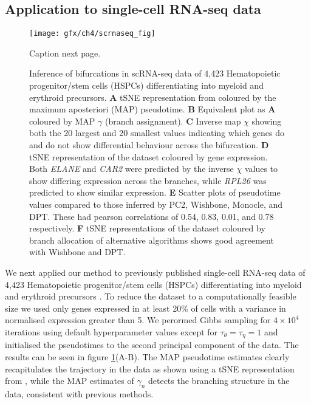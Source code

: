 \subsection{Application to single-cell RNA-seq data}

\begin{figure}
	\centering
	\texttt{[image: gfx/ch4/scrnaseq\_fig]}
	\caption{Caption next page.}
	 \label{fig:scrnaseq}
\end{figure}
\addtocounter{figure}{-1}
\begin{figure}
\caption{Inference of bifurcations in scRNA-seq data of 4,423 Hematopoietic progenitor/stem cells (HSPCs) differentiating into myeloid and erythroid precursors.
\textbf{A} tSNE representation from \cite{setty2016wishbone} coloured by the maximum aposteriori (MAP) pseudotime.
\textbf{B} Equivalent plot as \textbf{A} coloured by MAP $\gamma$ (branch assignment).
\textbf{C} Inverse map $\chi$ showing both the 20 largest and 20 smallest values indicating which genes do and do not show differential behaviour across the bifurcation.
\textbf{D} tSNE representation of the dataset coloured by gene expression. Both \emph{ELANE} and \emph{CAR2} were predicted by the inverse $\chi$ values to show differing expression across the branches, while \emph{RPL26} was predicted to show similar expression.
\textbf{E} Scatter plots of pseudotime values compared to those inferred by PC2, Wishbone, Monocle, and DPT. These had pearson correlations of 0.54, 0.83, 0.01, and 0.78 respectively.
\textbf{F} tSNE representations of the dataset coloured by branch allocation of alternative algorithms shows good agreement with Wishbone and DPT.}
\end{figure}


We next applied our method to previously published single-cell RNA-seq data of 4,423 Hematopoietic progenitor/stem cells (HSPCs) differentiating into myeloid and erythroid precursors \cite{paul2015transcriptional}.
To reduce the dataset to a computationally feasible size we used only genes expressed in at least 20\% of cells with a variance in normalised expression greater than 5.
We perormed Gibbs sampling for $4 \times 10^4$ iterations using default hyperparameter values except for $\tau_\theta = \tau_\eta = 1$ and initialised the pseudotimes to the second principal component of the data.
The results can be seen in figure \ref{fig:scrnaseq}(A-B). The MAP pseudotime estimates  clearly recapitulates the trajectory in the data as shown using a tSNE representation from \cite{setty2016wishbone}, while the MAP estimates of $\gamma_n$ detects the branching structure in the data, consistent with previous methods.


